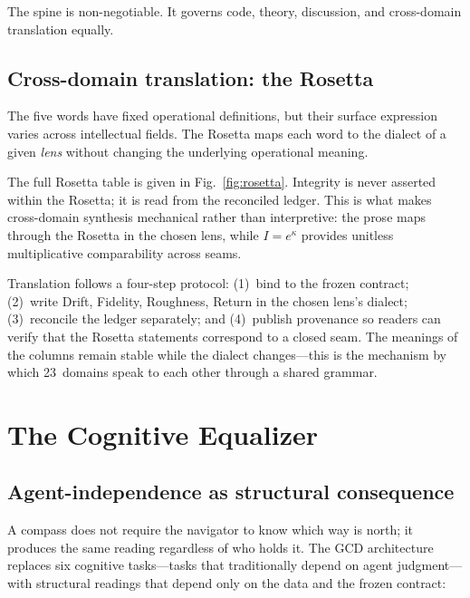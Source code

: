 \documentclass[
  aps,
  prd,
  twocolumn,
  superscriptaddress,
  nofootinbib,
  floatfix
]{revtex4-2}
\begin{document}
The spine is non-negotiable.  It governs code, theory, discussion,
and cross-domain translation equally.

\subsection{Cross-domain translation: the Rosetta}

The five words have fixed operational definitions, but their
surface expression varies across intellectual fields.  The Rosetta
maps each word to the dialect of a given \emph{lens} without
changing the underlying operational meaning.

The full Rosetta table is given in Fig.~\ref{fig:rosetta}.
Integrity is never asserted within the Rosetta; it is
read from the reconciled ledger.  This is what makes cross-domain
synthesis mechanical rather than interpretive: the prose maps
through the Rosetta in the chosen lens, while $I = e^\kappa$
provides unitless multiplicative comparability across seams.

Translation follows a four-step protocol: (1)~bind to the frozen
contract; (2)~write Drift, Fidelity, Roughness, Return in the
chosen lens's dialect; (3)~reconcile the ledger separately; and
(4)~publish provenance so readers can verify that the Rosetta
statements correspond to a closed seam.  The meanings of the
columns remain stable while the dialect changes---this is the
mechanism by which 23~domains speak to each other through a
shared grammar.


\section{The Cognitive Equalizer}\label{sec:equalizer}

\subsection{Agent-independence as structural consequence}

A compass does not require the navigator to know which way is
north; it produces the same reading regardless of who holds it.
The GCD architecture replaces six cognitive tasks---tasks that
traditionally depend on agent judgment---with structural readings
that depend only on the data and the frozen contract:
\end{document}
